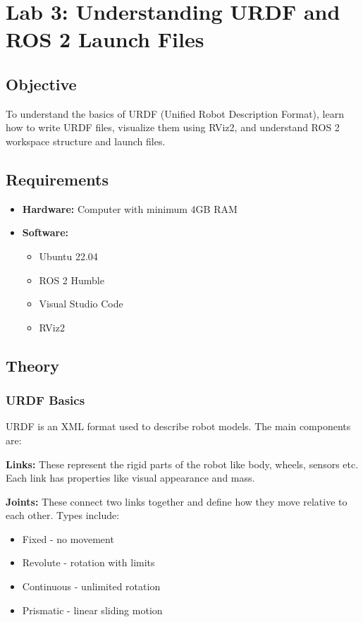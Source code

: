 \section{Lab 3: Understanding URDF and ROS 2 Launch Files}

\subsection{Objective}
To understand the basics of URDF (Unified Robot Description Format), learn how to write URDF files, visualize them using RViz2, and understand ROS 2 workspace structure and launch files.

\subsection{Requirements}
\begin{itemize}
	\item \textbf{Hardware:} Computer with minimum 4GB RAM
	\item \textbf{Software:} 
	\begin{itemize}
		\item Ubuntu 22.04
		\item ROS 2 Humble
		\item Visual Studio Code
		\item RViz2
	\end{itemize}
\end{itemize}

\subsection{Theory}

\subsubsection{URDF Basics}

URDF is an XML format used to describe robot models. The main components are:

\textbf{Links:} These represent the rigid parts of the robot like body, wheels, sensors etc. Each link has properties like visual appearance and mass.

\textbf{Joints:} These connect two links together and define how they move relative to each other. Types include:
\begin{itemize}
	\item Fixed - no movement
	\item Revolute - rotation with limits
	\item Continuous - unlimited rotation
	\item Prismatic - linear sliding motion
\end{itemize}

